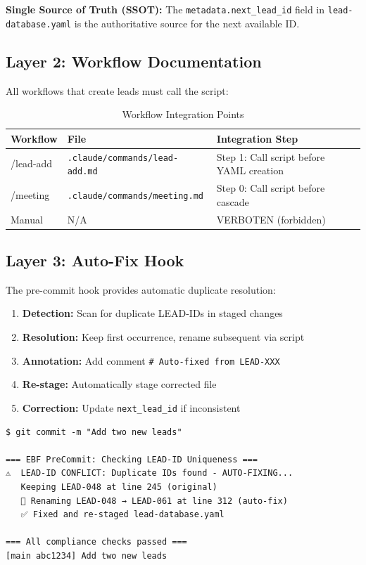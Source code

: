 \textbf{Single Source of Truth (SSOT):} The \texttt{metadata.next\_lead\_id} field in \texttt{lead-database.yaml} is the authoritative source for the next available ID.

\subsection{Layer 2: Workflow Documentation}

All workflows that create leads must call the script:

\begin{table}[htbp]
\centering
\caption{Workflow Integration Points}
\label{tab:bn-workflow-integration}
\renewcommand{\arraystretch}{1.3}
\begin{tabular}{@{}lll@{}}
\toprule
\textbf{Workflow} & \textbf{File} & \textbf{Integration Step} \\
\midrule
/lead-add & \texttt{.claude/commands/lead-add.md} & Step 1: Call script before YAML creation \\
/meeting & \texttt{.claude/commands/meeting.md} & Step 0: Call script before cascade \\
Manual & N/A & VERBOTEN (forbidden) \\
\bottomrule
\end{tabular}
\end{table}

\subsection{Layer 3: Auto-Fix Hook}

The pre-commit hook provides automatic duplicate resolution:

\begin{enumerate}
\item \textbf{Detection:} Scan for duplicate LEAD-IDs in staged changes
\item \textbf{Resolution:} Keep first occurrence, rename subsequent via script
\item \textbf{Annotation:} Add comment \texttt{\# Auto-fixed from LEAD-XXX}
\item \textbf{Re-stage:} Automatically stage corrected file
\item \textbf{Correction:} Update \texttt{next\_lead\_id} if inconsistent
\end{enumerate}

\begin{tcolorbox}[colback=green!5!white, colframe=green!75!black,
    title=Auto-Fix Example]
\begin{verbatim}
$ git commit -m "Add two new leads"

=== EBF PreCommit: Checking LEAD-ID Uniqueness ===
⚠️  LEAD-ID CONFLICT: Duplicate IDs found - AUTO-FIXING...
   Keeping LEAD-048 at line 245 (original)
   🔄 Renaming LEAD-048 → LEAD-061 at line 312 (auto-fix)
   ✅ Fixed and re-staged lead-database.yaml

=== All compliance checks passed ===
[main abc1234] Add two new leads
\end{verbatim}
\end{tcolorbox}


